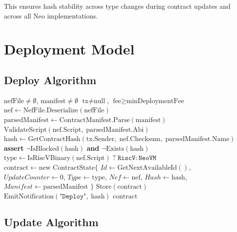\documentclass[11pt,a4paper]{article}
\begin{document}
This ensures hash stability across type changes during contract updates and
across all Neo implementations.

\section{Deployment Model}
\label{sec:deployment}

\subsection{Deploy Algorithm}

\begin{algorithm}[H]
\caption{ContractManagement.Deploy}
\label{alg:deploy}
\begin{algorithmic}[1]
\Require $\text{nefFile} \neq \emptyset$, $\text{manifest} \neq \emptyset$
\Require $\text{tx} \neq \text{null}$, $\text{fee} \geq \text{minDeploymentFee}$
\State $\text{nef} \gets \text{NefFile.Deserialize}(\text{nefFile})$
\State $\text{parsedManifest} \gets \text{ContractManifest.Parse}(\text{manifest})$
\State $\text{ValidateScript}(\text{nef.Script},\; \text{parsedManifest.Abi})$
\State $\text{hash} \gets \text{GetContractHash}(\text{tx.Sender},\; \text{nef.Checksum},\; \text{parsedManifest.Name})$
\State \textbf{assert} $\neg\text{IsBlocked}(\text{hash})$ \textbf{and} $\neg\text{Exists}(\text{hash})$
\State $\text{type} \gets \text{IsRiscVBinary}(\text{nef.Script})\; ?\; \texttt{RiscV} : \texttt{NeoVM}$
\State $\text{contract} \gets \text{new ContractState}\{$
\Statex \hspace{3em} $Id \gets \text{GetNextAvailableId}()$,
\Statex \hspace{3em} $UpdateCounter \gets 0$,
\Statex \hspace{3em} $Type \gets \text{type}$,
\Statex \hspace{3em} $Nef \gets \text{nef}$,
\Statex \hspace{3em} $Hash \gets \text{hash}$,
\Statex \hspace{3em} $Manifest \gets \text{parsedManifest}$
\Statex $\}$
\State $\text{Store}(\text{contract})$
\State $\text{EmitNotification}(\texttt{"Deploy"},\; \text{hash})$
\State \Return $\text{contract}$
\end{algorithmic}
\end{algorithm}

\subsection{Update Algorithm}
\end{document}
